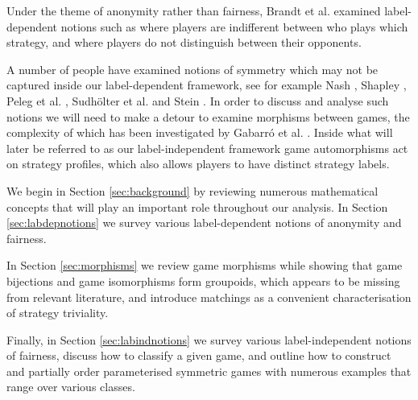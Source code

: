 Under the theme of anonymity rather than fairness, Brandt et al. \cite{brandt2009symmetries} examined label-dependent notions such as where players are indifferent between who plays which strategy, and where players do not distinguish between their opponents.

A number of people have examined notions of symmetry which may not be captured inside our label-dependent framework, see for example Nash \cite{NashNCG}, Shapley \cite{shapley1960symmetric}, Peleg et al. \cite{peleg1999canonical}, Sudh\"{o}lter et al. \cite{sudholter2000canonical} and Stein \cite{NoahXE}. In order to discuss and analyse such notions we will need to make a detour to examine morphisms between games, the complexity of which has been investigated by Gabarr\'{o} et al. \cite{IsoComplexity}. Inside what will later be referred to as our label-independent framework game automorphisms act on strategy profiles, which also allows players to have distinct strategy labels.

We begin in Section \ref{sec:background} by reviewing numerous mathematical concepts that will play an important role throughout our analysis. In Section \ref{sec:labdepnotions} we survey various label-dependent notions of anonymity and fairness. 

In Section \ref{sec:morphisms} we review game morphisms while showing that game bijections and game isomorphisms form groupoids, which appears to be missing from relevant literature, and introduce matchings as a convenient characterisation of strategy triviality. 

Finally, in Section \ref{sec:labindnotions} we survey various label-independent notions of fairness, discuss how to classify a given game, and outline how to construct and partially order parameterised symmetric games with numerous examples that range over various classes.

